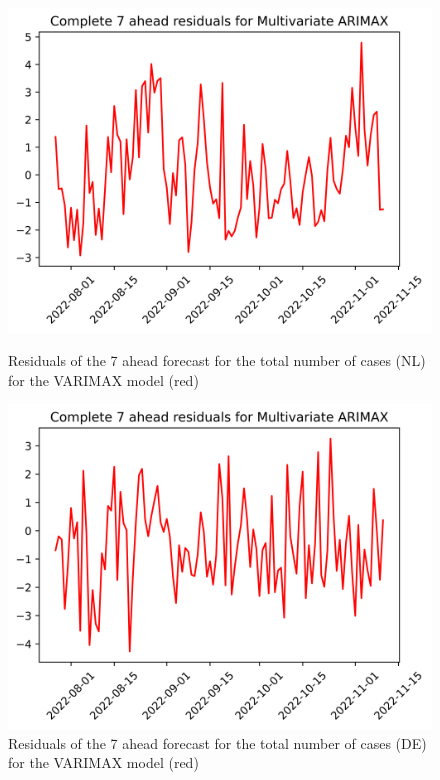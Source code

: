 \begin{figure}

\begin{minipage}{.45\textwidth}
  \centering
  \includegraphics[width=\linewidth]{pics/7_ah/7_ahead_errors_Multivariate ARIMAX.png}
  \caption{Residuals of the 7 ahead forecast for the total number of cases (NL) for the VARIMAX model (red)}
  \label{fig:tot_cases_error_7_VARIMAX}
\end{minipage}
\begin{minipage}{.45\textwidth}
  \centering
  \includegraphics[width=\linewidth]{pics/7_ah/DE_7_ahead_errors_Multivariate ARIMAX.png}
  \caption{Residuals of the 7 ahead forecast for the total number of cases (DE) for the VARIMAX model (red)}
  \label{fig:tot_cases_error_7_VARIMAX_DE}
\end{minipage}

\end{figure}
